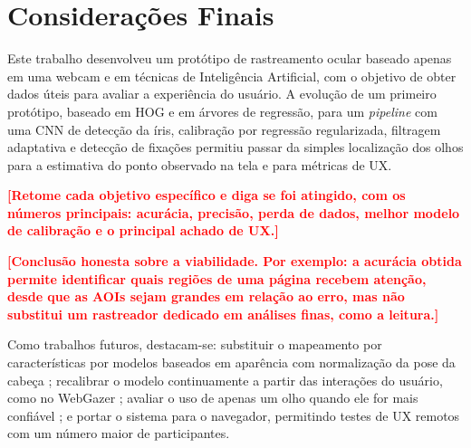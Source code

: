 \documentclass[sigconf, nonacm, language=english, language=portuguese, natbib=false]{acmart}
\newcommand{\pendente}[1]{\textcolor{red}{\textbf{[#1]}}}
\begin{document}
\section{Considerações Finais}\label{sec:conclusao}

Este trabalho desenvolveu um protótipo de rastreamento ocular baseado apenas em uma webcam e em técnicas de Inteligência Artificial, com o objetivo de obter dados úteis para avaliar a experiência do usuário. A evolução de um primeiro protótipo, baseado em HOG e em árvores de regressão, para um \emph{pipeline} com uma CNN de detecção da íris, calibração por regressão regularizada, filtragem adaptativa e detecção de fixações permitiu passar da simples localização dos olhos para a estimativa do ponto observado na tela e para métricas de UX.

\pendente{Retome cada objetivo específico e diga se foi atingido, com os números principais: acurácia, precisão, perda de dados, melhor modelo de calibração e o principal achado de UX.}

\pendente{Conclusão honesta sobre a viabilidade. Por exemplo: a acurácia obtida permite identificar quais regiões de uma página recebem atenção, desde que as AOIs sejam grandes em relação ao erro, mas não substitui um rastreador dedicado em análises finas, como a leitura.}

Como trabalhos futuros, destacam-se: substituir o mapeamento por características por modelos baseados em aparência com normalização da pose da cabeça \cite{zhang18_etra, Park2018ETRA}; recalibrar o modelo continuamente a partir das interações do usuário, como no WebGazer \cite{papoutsaki2016webgazer}; avaliar o uso de apenas um olho quando ele for mais confiável \cite{hooge2019}; e portar o sistema para o navegador, permitindo testes de UX remotos com um número maior de participantes.

\printbibliography
\end{document}
